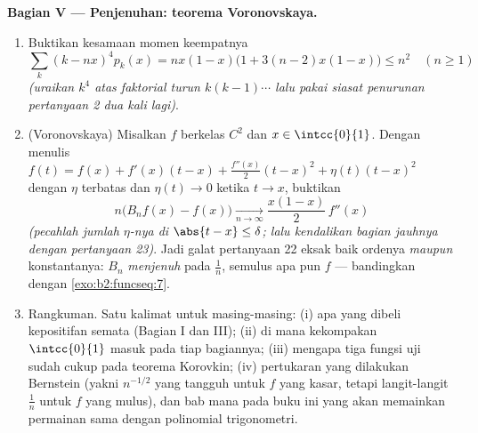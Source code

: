 \begin{problem}
\medskip
\noindent\textbf{Bagian V --- Penjenuhan: teorema
Voronovskaya.}
\begin{enumerate}[resume]
  \item Buktikan kesamaan momen keempatnya
        \[
        \sum_k (k - nx)^4 p_k(x)
        = nx(1-x)\bigl(1 + 3(n-2)x(1-x)\bigr) \leq n^2
        \quad (n \geq 1)
        \]
        \emph{(uraikan $k^4$ atas faktorial turun $k(k-1)\cdots$
        lalu pakai siasat penurunan pertanyaan 2 dua kali
        lagi)}.
  \item (Voronovskaya) Misalkan $f$ berkelas $C^2$ dan $x \in
        \intcc{0}{1}$. Dengan menulis $f(t) = f(x) + f'(x)(t-x) +
        \frac{f''(x)}2(t-x)^2 + \eta(t)(t-x)^2$ dengan $\eta$
        terbatas dan $\eta(t) \to 0$ ketika $t \to x$, buktikan
        \[
        n\bigl(B_nf(x) - f(x)\bigr)
        \xrightarrow[n\to\infty]{}
        \frac{x(1-x)}{2}\,f''(x)
        \]
        \emph{(pecahlah jumlah $\eta$-nya di $\abs{t - x} \leq
        \delta$; lalu kendalikan bagian jauhnya dengan pertanyaan 23)}.
        Jadi galat pertanyaan 22 eksak baik ordenya \emph{maupun}
        konstantanya: $B_n$ \emph{menjenuh} pada $\frac1n$, semulus apa
        pun $f$ --- bandingkan dengan
        \cref{exo:b2:funcseq:7}.
  \item Rangkuman. Satu kalimat untuk masing-masing: (i) apa yang
        dibeli kepositifan semata (Bagian I dan III); (ii) di mana
        kekompakan $\intcc{0}{1}$ masuk pada tiap bagiannya; (iii)
        mengapa tiga fungsi uji sudah cukup pada teorema Korovkin; (iv)
        pertukaran yang dilakukan Bernstein (yakni $n^{-1/2}$ yang
        tangguh untuk $f$ yang kasar, tetapi langit-langit $\frac1n$
        untuk $f$ yang mulus), dan bab mana pada buku ini yang akan
        memainkan permainan sama dengan polinomial trigonometri.

\end{enumerate}
\end{problem}
